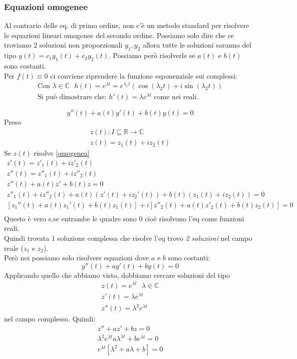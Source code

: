 \subsubsection{Equazioni omogenee}
Al contrario delle eq. di primo ordine, non c'è un metodo standard per risolvere le equazioni lineari omogenee del secondo ordine. Possiamo solo dire che ce troviamo 2 soluzioni non proporzionali $y_1, y_2$ allora tutte le soluzioni saranno del tipo $y(t)=c_1y_1(t)+c_2y_2(t)$. Possiamo però risolverle se $a(t)$ e $b(t)$ sono costanti. \\
Per $f(t) \equiv 0$ ci conviene riprendere la funzione esponenziale sui complessi:
\begin{gather*}
     \text{Con }\lambda \in \mathbb{C}\ \ \ h(t) = e^{\lambda t} = e^{\lambda_1 t}(\cos(\lambda_2 t) + i\sin(\lambda_2 t)) \\
    \text{Si può dimostrare che: } h'(t) = \lambda e^{\lambda t} \text{ come nei reali.}
\end{gather*}

\begin{equation}\label{omogenea}
    y''(t) + a(t)y'(t) + b(t)y(t) = 0
\end{equation}
Preso
\begin{gather*}
    z(t): I\subseteq \mathbb{R}\longrightarrow \mathbb{C} \\
    z(t) = z_1(t) + iz_2(t)
\end{gather*}
Se $z(t)$ risolve \ref{omogenea}
\begin{gather*}
    z'(t) = z'_1(t) + iz'_2(t) \\
    z''(t) = z''_1(t) + iz''_2(t) \\
    z''(t) + a(t)z' + b(t)z = 0 \\
    z''_1(t) + iz''_2(t) + a(t)(z'(t) + iz_2'(t))+b(t)(z_1(t)+iz_2(t)) = 0 \\
    [z_1''(t)+a(t)z_1'(t)+b(t)z_1(t)] + i[z''_2(t)+a(t)z'_2(t)+b(t)z_2(t)] = 0 \\
\end{gather*}
Questo è vero s.se entrambe le quadre sono 0 cioè risolvono l'eq come funzioni reali. \\
Quindi trovata 1 soluzione complessa che risolve l'eq trovo \textit{2 soluzioni} nel campo reale ($z_1$ e $z_2$). \\
Però noi possiamo solo risolvere equazioni dove $a$ e $b$ sono costanti:
\begin{equation*}
    y''(t)+ay'(t)+by(t)=0
\end{equation*}
Applicando quello che abbiamo visto, dobbiamo cercare soluzioni del tipo
\begin{gather*}
    z(t) = e^{\lambda t}\ \ \ \lambda\in \mathbb{C} \\
    z'(t) = \lambda e^{\lambda t} \\
    z''(t) = \lambda^2e^{\lambda t}
\end{gather*}
nel campo complesso. Quindi:
\begin{gather*}
    z''+az'+bz = 0 \\
    \lambda^2e^{\lambda t}a \lambda^{\lambda t}+ be^{\lambda t} = 0 \\
    e^{\lambda t}[\lambda^2 + a \lambda + b] = 0
\end{gather*}

